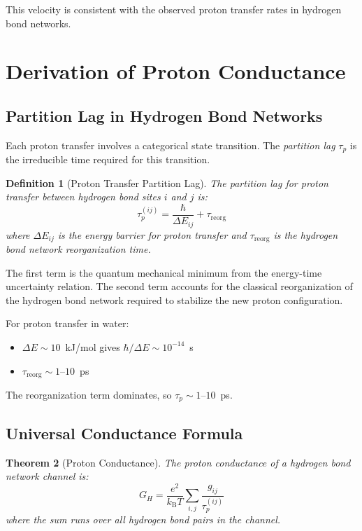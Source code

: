 \documentclass[twocolumn,showpacs,preprintnumbers,amsmath,amssymb,prd]{revtex4-2}
\newtheorem{theorem}{Theorem}[section]
\newtheorem{definition}[theorem]{Definition}
\newcommand{\taup}{\tau_p}
\newcommand{\kB}{k_{\text{B}}}
\begin{document}
This velocity is consistent with the observed proton transfer rates in hydrogen bond networks.


\section{Derivation of Proton Conductance}
\label{sec:conductance}

\subsection{Partition Lag in Hydrogen Bond Networks}

Each proton transfer involves a categorical state transition. The \emph{partition lag} $\taup$ is the irreducible time required for this transition.

\begin{definition}[Proton Transfer Partition Lag]
\label{def:proton_partition_lag}
The partition lag for proton transfer between hydrogen bond sites $i$ and $j$ is:
\begin{equation}
\taup^{(ij)} = \frac{\hbar}{\Delta E_{ij}} + \tau_{\text{reorg}}
\label{eq:proton_partition_lag}
\end{equation}
where $\Delta E_{ij}$ is the energy barrier for proton transfer and $\tau_{\text{reorg}}$ is the hydrogen bond network reorganization time.
\end{definition}

The first term is the quantum mechanical minimum from the energy-time uncertainty relation. The second term accounts for the classical reorganization of the hydrogen bond network required to stabilize the new proton configuration.

For proton transfer in water:
\begin{itemize}
\item $\Delta E \sim 10$~kJ/mol gives $\hbar/\Delta E \sim 10^{-14}$~s
\item $\tau_{\text{reorg}} \sim 1$--$10$~ps
\end{itemize}

The reorganization term dominates, so $\taup \sim 1$--$10$~ps.

\subsection{Universal Conductance Formula}

\begin{theorem}[Proton Conductance]
\label{thm:proton_conductance}
The proton conductance of a hydrogen bond network channel is:
\begin{equation}
G_H = \frac{e^2}{\kB T} \sum_{i,j} \frac{g_{ij}}{\taup^{(ij)}}
\label{eq:proton_conductance}
\end{equation}
where the sum runs over all hydrogen bond pairs in the channel.
\end{theorem}
\end{document}
